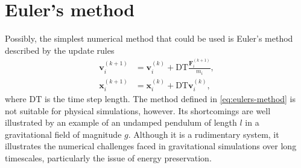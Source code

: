\section{Euler's method}
Possibly, the simplest numerical method that could be used is Euler's method described by the update rules
\begin{equation}\label{eq:eulers-method}
    \begin{aligned}
        \mathbf{v}_i^{(k+1)} & = \mathbf{v}_i^{(k)} + \textrm{DT} \frac{\mathbf{F}^{(k+1)}_i}{m_i}, \\
        \mathbf{x}_i^{(k+1)} & = \mathbf{x}_i^{(k)} + \textrm{DT} \mathbf{v}_i^{(k)},
    \end{aligned}
\end{equation}
where $\mathrm{DT}$ is the time step length.
The method defined in \autoref{eq:eulers-method} is not suitable for physical simulations, however.
Its shortcomings are well illustrated by an example of an undamped pendulum of length $l$ in a gravitational field of magnitude $g$.
Although it is a rudimentary system, it illustrates the numerical challenges faced in gravitational simulations over long timescales, particularly the issue of energy preservation.

